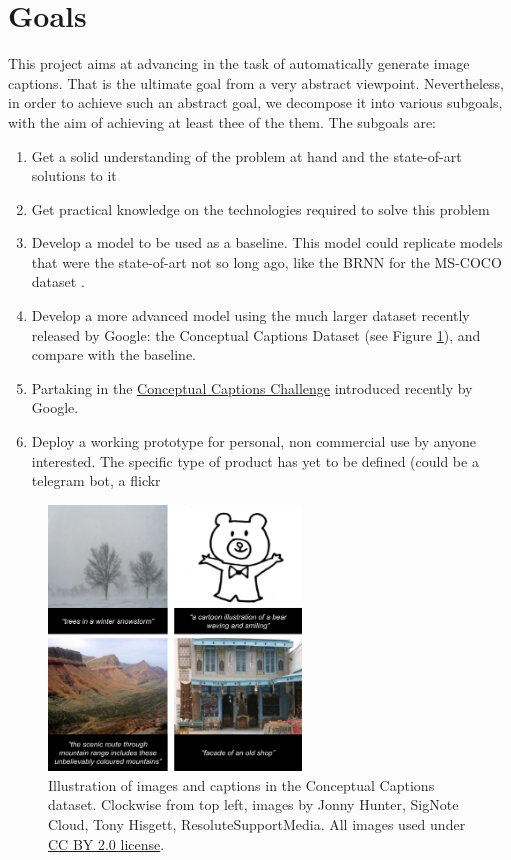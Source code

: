 \section{Goals}

This project aims at advancing in the task of automatically generate image captions. That is the ultimate goal from a very abstract viewpoint. Nevertheless, in order to achieve such an abstract goal, we decompose it into various subgoals, with the aim of achieving at least thee of the them. The subgoals are:

\begin{enumerate}
\item Get a solid understanding of the problem at hand and the state-of-art solutions to it
\item Get practical knowledge on the technologies required to solve this problem
\item Develop a model to be used as a baseline. This model could replicate models that were the state-of-art not so long ago, like the BRNN \cite{Karpathy2017} for the MS-COCO dataset \cite{Lin2014}.
\item Develop a more advanced model using the much larger dataset recently released by Google: the Conceptual Captions Dataset\cite{Sharma2018} (see Figure \ref{fig:conceptual-captions}), and compare with the baseline.
\item Partaking in the \href{https://ai.google.com/research/ConceptualCaptions/}{Conceptual Captions Challenge} introduced recently by Google.
\item Deploy a working prototype for personal, non commercial use by anyone interested. The specific type of product has yet to be defined (could be a telegram bot, a flickr  
\end{enumerate}

\begin{figure}[h]
	\centering
	\includegraphics[width=0.6\textwidth]{figs/ch1/conceptual-captions-example.png}
	\caption{Illustration of images and captions in the Conceptual Captions dataset. 
Clockwise from top left, images by Jonny Hunter, SigNote Cloud, Tony Hisgett, ResoluteSupportMedia. All images used under \href{https://creativecommons.org/licenses/by/2.0/}{CC BY 2.0 license}.}
	\label{fig:conceptual-captions}
\end{figure}

